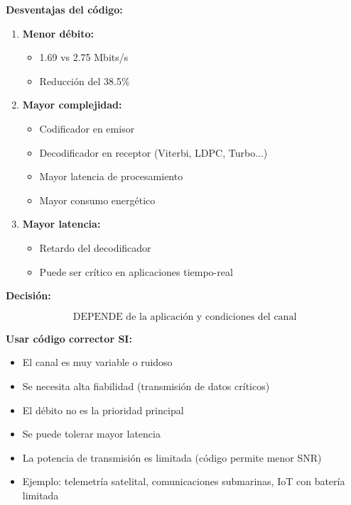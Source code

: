\documentclass[11pt,a4paper]{article}
\begin{document}
\textbf{Desventajas del c\'odigo:}

\begin{enumerate}
    \item \textbf{Menor d\'ebito:}
    \begin{itemize}
        \item 1.69 vs 2.75 Mbits/s
        \item Reducci\'on del 38.5\%
    \end{itemize}
    
    \item \textbf{Mayor complejidad:}
    \begin{itemize}
        \item Codificador en emisor
        \item Decodificador en receptor (Viterbi, LDPC, Turbo...)
        \item Mayor latencia de procesamiento
        \item Mayor consumo energ\'etico
    \end{itemize}
    
    \item \textbf{Mayor latencia:}
    \begin{itemize}
        \item Retardo del decodificador
        \item Puede ser cr\'itico en aplicaciones tiempo-real
    \end{itemize}
\end{enumerate}

\textbf{Decisi\'on:}

\[
\boxed{\text{DEPENDE de la aplicaci\'on y condiciones del canal}}
\]

\textbf{Usar c\'odigo corrector SI:}

\begin{itemize}
    \item El canal es muy variable o ruidoso
    \item Se necesita alta fiabilidad (transmisi\'on de datos cr\'iticos)
    \item El d\'ebito no es la prioridad principal
    \item Se puede tolerar mayor latencia
    \item La potencia de transmisi\'on es limitada (c\'odigo permite menor SNR)
    \item Ejemplo: telemetr\'ia satelital, comunicaciones submarinas, IoT con bater\'ia limitada
\end{itemize}
\end{document}
